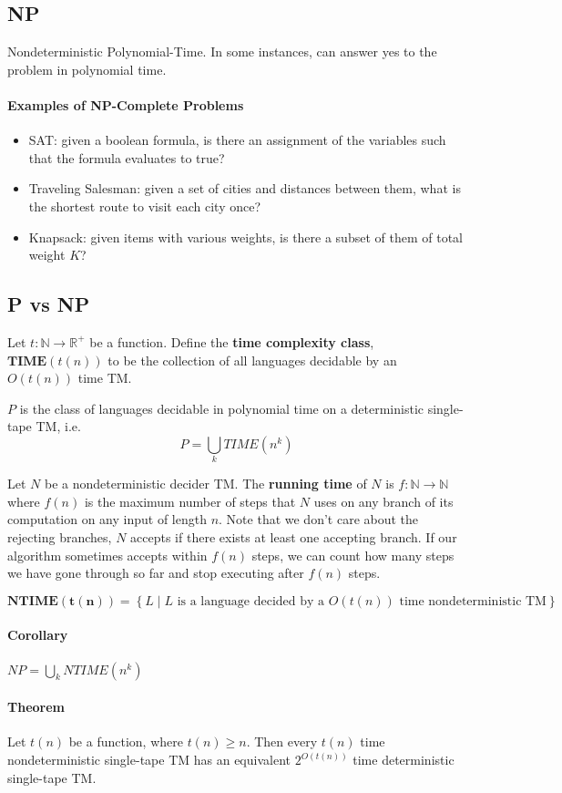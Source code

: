 \documentclass[12 pt]{article}
\begin{document}
\subsection{NP}
Nondeterministic Polynomial-Time. In some instances, can answer yes to
the problem in polynomial time.
\paragraph{Examples of NP-Complete Problems}
\begin{itemize}
\item SAT: given a boolean formula, is there an assignment of the
  variables such that the formula evaluates to true?
\item Traveling Salesman: given a set of cities and distances between
  them, what is the shortest route to visit each city once?
\item Knapsack: given items with various weights, is there a subset of
  them of total weight $K$?
\end{itemize}
\subsection{P vs NP}
Let $t: \mathbb{N} \to \mathbb{R}^+$ be a function. Define the
\textbf{time complexity class}, $\mathbf{TIME}(t(n))$ to be the
collection of all languages decidable by an $O(t(n))$ time TM.

$P$ is the class of languages decidable in polynomial time on a
deterministic single-tape TM, i.e.\
$$P = \bigcup_k TIME(n^k)$$

Let $N$ be a nondeterministic decider TM. The \textbf{running time} of
$N$ is $f: \mathbb{N} \to \mathbb{N}$ where $f(n)$ is the maximum
number of steps that $N$ uses on any branch of its computation on any
input of length $n$. Note that we don't care about the rejecting
branches, $N$ accepts if there exists at least one accepting
branch. If our algorithm sometimes accepts within $f(n)$ steps, we can
count how many steps we have gone through so far and stop executing
after $f(n)$ steps.

$$\mathbf{NTIME(t(n))} = \left\{L \mid L \text{ is a language decided
    by a } O(t(n)) \text{ time nondeterministic TM}\right\}$$
\paragraph{Corollary} $NP = \bigcup_k NTIME(n^k)$
\paragraph{Theorem} Let $t(n)$ be a function, where $t(n) \geq
n$. Then every $t(n)$ time nondeterministic single-tape TM has an
equivalent $2^{O(t(n))}$ time deterministic single-tape TM.
\end{document}
